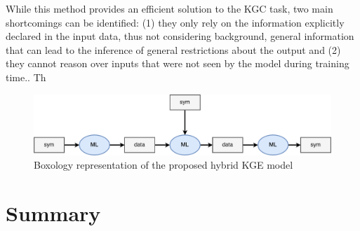 While this method provides an efficient solution to the KGC task, two main shortcomings can be identified: (1) they only rely on the information explicitly declared in the input data, thus not considering background, general information that can lead to the inference of general restrictions about the output and (2) they cannot reason over inputs that were not seen by the model during training time.. Th

\begin{figure}
    \centering
    \includegraphics[width=\linewidth]{4_kbsintegrationdl/figures/boxology_krintodl.png}
    \caption{Boxology representation of the proposed hybrid KGE model}
    \label{fig:box_krintodl}
\end{figure}

\section{Summary}